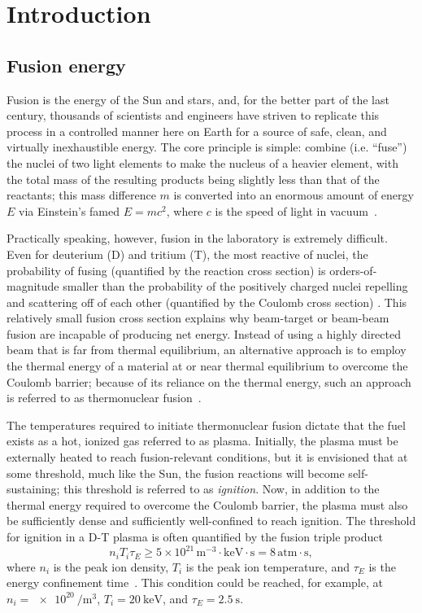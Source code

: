 \chapter{Introduction}
\label{ch:Introduction}


\section{Fusion energy}
Fusion is the energy of the Sun and stars, and,
for the better part of the last century,
thousands of scientists and engineers have striven
to replicate this process in a controlled manner here on Earth
for a source of safe, clean, and virtually inexhaustible energy.
The core principle is simple:
combine (i.e. ``fuse'') the nuclei of two light elements
to make the nucleus of a heavier element,
with the total mass of the resulting products
being slightly less than that of the reactants;
this mass difference $m$
is converted into an enormous amount of energy $E$
via Einstein's famed $E = m c^2$, where
$c$ is the speed of light in vacuum~\cite[Ch.~14]{krane}.

Practically speaking, however, fusion in the laboratory is extremely difficult.
Even for deuterium (D) and tritium (T), the most reactive of nuclei,
the probability of fusing
(quantified by the reaction cross section)
is orders-of-magnitude smaller than
the probability of the positively charged nuclei
repelling and scattering off of each other
(quantified by the Coulomb cross section)
\cite[Sec.~9.3.4]{freidberg_fusion_energy}.
This relatively small fusion cross section explains why
beam-target or beam-beam fusion are incapable of producing net energy.
Instead of using a highly directed beam that is far from thermal equilibrium,
an alternative approach is to employ the thermal energy
of a material at or near thermal equilibrium
to overcome the Coulomb barrier;
because of its reliance on the thermal energy,
such an approach is referred to as thermonuclear fusion~\cite[Ch.~14]{krane}.

The temperatures required to initiate thermonuclear fusion
dictate that the fuel exists as a hot, ionized gas
referred to as plasma.
Initially, the plasma must be externally heated
to reach fusion-relevant conditions, but
it is envisioned that at some threshold, much like the Sun,
the fusion reactions will become self-sustaining;
this threshold is referred to as \emph{ignition}.
Now, in addition to the thermal energy
required to overcome the Coulomb barrier,
the plasma must also be sufficiently dense and
sufficiently well-confined
to reach ignition.
The threshold for ignition in a D-T plasma is often quantified
by the fusion triple product
\begin{equation}
  n_{i} T_{i} \tau_E
  \geq
  5 \times 10^{21} \, \text{m}^{-3} \cdot \text{keV} \cdot \text{s}
  =
  8 \, \text{atm} \cdot \text{s},
  \label{eq:Introduction:fusion_triple_product}
\end{equation}
where
$n_{i}$ is the peak ion density,
$T_{i}$ is the peak ion temperature, and
$\tau_E$ is the energy confinement time~\cite[Sec.~1.1]{wesson}.
This condition could be reached, for example, at
$n_i = \SI{e20}{\per\meter\cubed}$,
$T_i = \SI{20}{\kilo\eV}$, and
$\tau_E = \SI{2.5}{\second}$.

